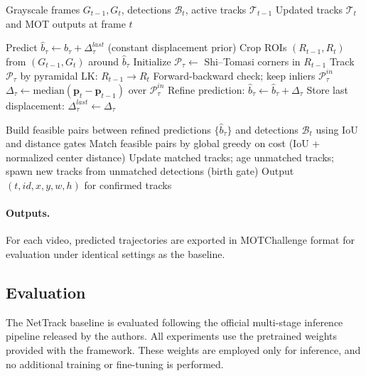 \begin{algorithm}[t]
\small
\caption{Online tracking with IK (Iterative LK) refinement}
\label{alg:ik_tracker}
\begin{algorithmic}[1]
\REQUIRE Grayscale frames $G_{t-1}, G_t$, detections $\mathcal{B}_t$, active tracks $\mathcal{T}_{t-1}$
\ENSURE Updated tracks $\mathcal{T}_t$ and MOT outputs at frame $t$

    \STATE Predict $\hat{b}_\tau \leftarrow b_\tau + \Delta^{last}_\tau$ \hfill (constant displacement prior)
    \STATE Crop ROIs $(R_{t-1},R_t)$ from $(G_{t-1},G_t)$ around $\hat{b}_\tau$
        \STATE Initialize $\mathcal{P}_\tau \leftarrow$ Shi--Tomasi corners in $R_{t-1}$
    \ENDIF
    \STATE Track $\mathcal{P}_\tau$ by pyramidal LK: $R_{t-1}\rightarrow R_t$
    \STATE Forward-backward check; keep inliers $\mathcal{P}_\tau^{in}$
        \STATE $\Delta_\tau \leftarrow \mathrm{median}(\mathbf{p}_t-\mathbf{p}_{t-1})$ over $\mathcal{P}_\tau^{in}$
        \STATE Refine prediction: $\hat{b}_\tau \leftarrow \hat{b}_\tau + \Delta_\tau$
        \STATE Store last displacement: $\Delta^{last}_\tau \leftarrow \Delta_\tau$
    \ENDIF
\ENDFOR

\STATE Build feasible pairs between refined predictions $\{\hat{b}_\tau\}$ and detections $\mathcal{B}_t$ using IoU and distance gates
\STATE Match feasible pairs by global greedy on cost (IoU + normalized center distance)
\STATE Update matched tracks; age unmatched tracks; spawn new tracks from unmatched detections (birth gate)
\STATE Output $(t, id, x, y, w, h)$ for confirmed tracks
\end{algorithmic}
\end{algorithm}

\paragraph{Outputs.}
For each video, predicted trajectories are exported in MOTChallenge format for evaluation under identical settings as the baseline.


\subsection{Evaluation}

The NetTrack baseline is evaluated following the official multi-stage inference pipeline released by the authors. All experiments use the pretrained weights provided with the framework. These weights are employed only for inference, and no additional training or fine-tuning is performed.

